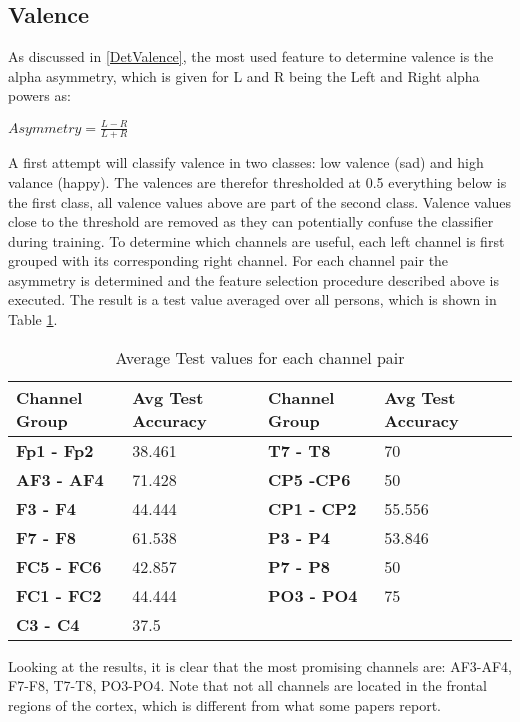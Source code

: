 \subsection{Valence}
As discussed in \ref{DetValence}, the most used feature to determine valence is the alpha asymmetry, which is given for L and R being the Left and Right alpha powers as:\\
\begin{center}
$Asymmetry = \frac{L-R}{L+R}$
\end{center}
A first attempt will classify valence in two classes: low valence (sad) and high valance (happy). The valences are therefor thresholded at 0.5 everything below is the first class, all valence values above are part of the second class. Valence values close to the threshold are removed as they can potentially confuse the classifier during training. To determine which channels are useful, each left channel is first grouped with its corresponding right channel. For each channel pair the asymmetry is determined and the feature selection procedure described above is executed. The result is a test value averaged over all persons, which is shown in Table \ref{channelSelection}.

\begin{table}[H]
\centering
\begin{tabular}{ll|ll}
\textbf{Channel Group} & \textbf{Avg Test Accuracy} & \textbf{Channel Group} & \textbf{Avg Test Accuracy} \\ \hline
\textbf{Fp1 - Fp2}     & 38.461                     & \textbf{T7 - T8}       & 70                         \\
\textbf{AF3 - AF4}     & 71.428                     & \textbf{CP5 -CP6}      & 50                         \\
\textbf{F3 - F4}       & 44.444                     & \textbf{CP1 - CP2}     & 55.556                     \\
\textbf{F7 - F8}       & 61.538                     & \textbf{P3 - P4}       & 53.846                     \\
\textbf{FC5 - FC6}     & 42.857                     & \textbf{P7 - P8}       & 50                         \\
\textbf{FC1 - FC2}     & 44.444                     & \textbf{PO3 - PO4}     & 75                         \\
\textbf{C3 - C4}       & 37.5                       &                        &                           
\end{tabular}
\caption{Average Test values for each channel pair\label{channelSelection}}
\end{table}

Looking at the results, it is clear that the most promising channels are: AF3-AF4, F7-F8, T7-T8, PO3-PO4. Note that not all channels are located in the frontal regions of the cortex, which is different from what some papers report. %